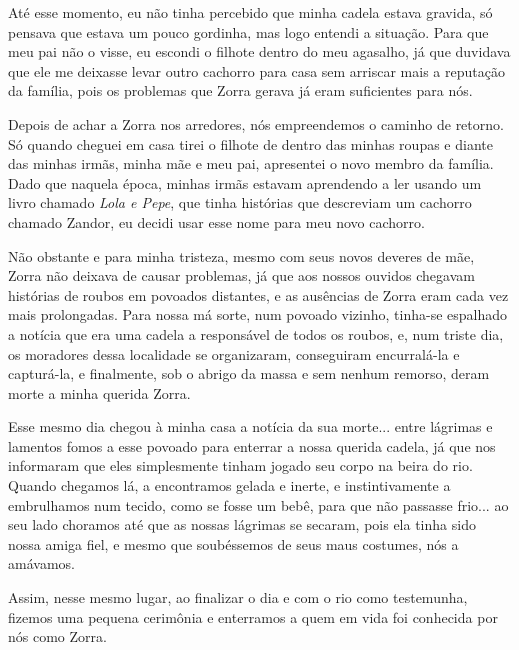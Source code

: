 Até esse momento, eu não tinha percebido que minha cadela estava gravida, só pensava que estava um pouco gordinha,
mas logo entendi a situação.
Para que meu pai não o visse, eu escondi o filhote dentro do meu agasalho, já que duvidava que ele me deixasse levar outro cachorro para casa sem arriscar mais a reputação da família, pois os problemas que Zorra gerava já eram suficientes para nós.

Depois de achar a Zorra nos arredores, nós empreendemos o caminho de retorno.
Só quando cheguei em casa tirei o filhote de dentro das minhas roupas e diante das minhas irmãs, minha mãe e meu pai, apresentei o novo membro da família. Dado que naquela época, minhas irmãs estavam aprendendo a ler usando um livro chamado \textit{Lola e Pepe}, que tinha histórias que descreviam um cachorro chamado Zandor, eu decidi usar esse nome para meu novo cachorro. 

Não obstante e para minha tristeza, mesmo com seus novos deveres de mãe, Zorra não deixava de causar problemas, já que aos nossos ouvidos chegavam histórias de roubos em povoados distantes, e as ausências de Zorra eram cada vez mais prolongadas.
Para nossa má sorte, num povoado vizinho, tinha-se espalhado a notícia que era uma cadela a responsável de todos os roubos, e, num triste dia, os moradores dessa localidade se organizaram, conseguiram encurralá-la e capturá-la, e finalmente, sob o abrigo da massa e sem nenhum remorso, deram morte a minha querida Zorra.

Esse mesmo dia chegou à minha casa a notícia da sua morte... entre lágrimas e lamentos fomos a esse povoado para enterrar a nossa querida cadela, já que nos informaram que eles simplesmente tinham jogado seu corpo na beira do rio. Quando chegamos lá, a encontramos gelada e inerte, e instintivamente a embrulhamos num tecido, como se fosse um bebê, para que não passasse frio... ao seu lado choramos até que as nossas lágrimas se secaram, pois ela tinha sido nossa amiga fiel, e mesmo que soubéssemos de  seus maus costumes, nós a amávamos.

Assim, nesse mesmo lugar, ao finalizar o dia e com o rio como testemunha, fizemos uma pequena cerimônia e enterramos a quem em vida foi conhecida por nós como Zorra. 

